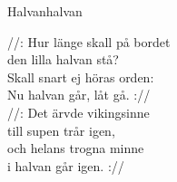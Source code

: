 \begin{song}{Halvan}{halvan}
\begin{vers}
//: Hur länge skall på bordet\\
den lilla halvan stå?\\
Skall snart ej höras orden:\\
Nu halvan går, låt gå. ://\\
//: Det ärvde vikingsinne\\
till supen trår igen,\\
och helans trogna minne\\
i halvan går igen. ://\\
\end{vers}
\end{song}
